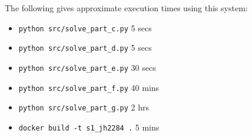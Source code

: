 \documentclass[12pt]{article}
\begin{document}
The following gives approximate execution times using this system:
\begin{itemize}
  \item \texttt{python src/solve\_part\_c.py} 5 secs
  \item \texttt{python src/solve\_part\_d.py} 5 secs
  \item \texttt{python src/solve\_part\_e.py} 30 secs
  \item \texttt{python src/solve\_part\_f.py} 40 mins
  \item \texttt{python src/solve\_part\_g.py} 2 hrs
  \item \texttt{docker build -t s1\_jh2284 .} 5 mins
\end{itemize}
\end{document}
